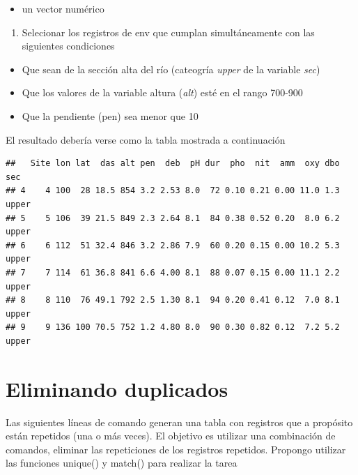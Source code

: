 \documentclass[]{book}
\providecommand{\tightlist}{%
  \setlength{\itemsep}{0pt}\setlength{\parskip}{0pt}}
\begin{document}
\begin{itemize}
\tightlist
\item
  un vector numérico
\end{itemize}

\begin{enumerate}
\def\labelenumi{\arabic{enumi}.}
\setcounter{enumi}{2}
\tightlist
\item
  Selecionar los registros de env que cumplan simultáneamente con las siguientes condiciones
\end{enumerate}

\begin{itemize}
\tightlist
\item
  Que sean de la sección alta del río (cateogría \emph{upper} de la variable \emph{sec})
\item
  Que los valores de la variable altura (\emph{alt}) esté en el rango 700-900
\item
  Que la pendiente (pen) sea menor que 10
\end{itemize}

El resultado debería verse como la tabla mostrada a continuación

\begin{verbatim}
##   Site lon lat  das alt pen  deb  pH dur  pho  nit  amm  oxy dbo   sec
## 4    4 100  28 18.5 854 3.2 2.53 8.0  72 0.10 0.21 0.00 11.0 1.3 upper
## 5    5 106  39 21.5 849 2.3 2.64 8.1  84 0.38 0.52 0.20  8.0 6.2 upper
## 6    6 112  51 32.4 846 3.2 2.86 7.9  60 0.20 0.15 0.00 10.2 5.3 upper
## 7    7 114  61 36.8 841 6.6 4.00 8.1  88 0.07 0.15 0.00 11.1 2.2 upper
## 8    8 110  76 49.1 792 2.5 1.30 8.1  94 0.20 0.41 0.12  7.0 8.1 upper
## 9    9 136 100 70.5 752 1.2 4.80 8.0  90 0.30 0.82 0.12  7.2 5.2 upper
\end{verbatim}

\hypertarget{eliminando-duplicados}{%
\section{Eliminando duplicados}\label{eliminando-duplicados}}

Las siguientes líneas de comando generan una tabla con registros que a propósito están repetidos (una o más veces). El objetivo es utilizar una combinación de comandos, eliminar las repeticiones de los registros repetidos. Propongo utilizar las funciones unique() y match() para realizar la tarea
\end{document}
